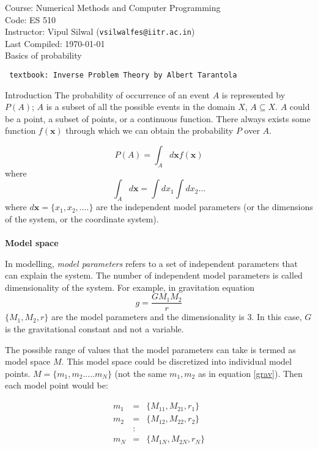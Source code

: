 \documentclass[11pt,titlepage,fleqn]{article}
\begin{document}
\noindent Course: Numerical Methods and Computer Programming\\
\noindent Code: ES 510\\
\noindent Instructor: Vipul Silwal (\verb+vsilwalfes@iitr.ac.in+) \\ 
\noindent Last Compiled: \today \\

{\huge Basics of probability}

\verb+ textbook: Inverse Problem Theory by Albert Tarantola+
\tableofcontents

\begin{section}{Introduction}
The probability of occurrence of an event $A$ is represented by $P(A)$; $A$ is a subset of all the possible events in the domain $X$, $A \subseteq X$. $A$ could be a point, a subset of points, or a continuous function. There always exists some function $f(\pmb{x})$ through which we can obtain the probability $P$ over $A$.

\begin{equation}
P(A) = \int_A d\pmb{x} f(\pmb{x})
\end{equation}
where 
\begin{equation}
\int_A d\pmb{x} = \int dx_1 \int dx_2 ...
\end{equation}
where $d\pmb{x} = \{x_1, x_2, ....\}$ are the independent model parameters (or the dimensions of the system, or the coordinate system).
\\
\\
{\bf Model space}

In modelling, {\it model parameters} refers to a set of independent parameters that can explain the system. The number of independent model parameters is called dimensionality of the system. 
For example, in gravitation equation
\begin{equation}
g = \frac{GM_1M_2}{r} \label{grav}
\end{equation}
$\{M_1,M_2,r\}$ are the model parameters and the dimensionality is 3. In this case, $G$ is the gravitational constant and not a variable.

The possible range of values that the model parameters can take is termed as model space $M$. This model space could be discretized into individual model points. $M = \{m_1,m_2.....m_N\}$ (not the same $m_1,m_2$ as in equation \ref{grav}). Then each model point would be:

\begin{eqnarray*}
m_1 &=& \{M_{11}, M_{21}, r_1\}\\
m_2 &=& \{M_{12}, M_{22}, r_2\}\\
&:&\\
m_N &=& \{M_{1N}, M_{2N}, r_N\}
\end{eqnarray*}


\end{section}
\end{document}
